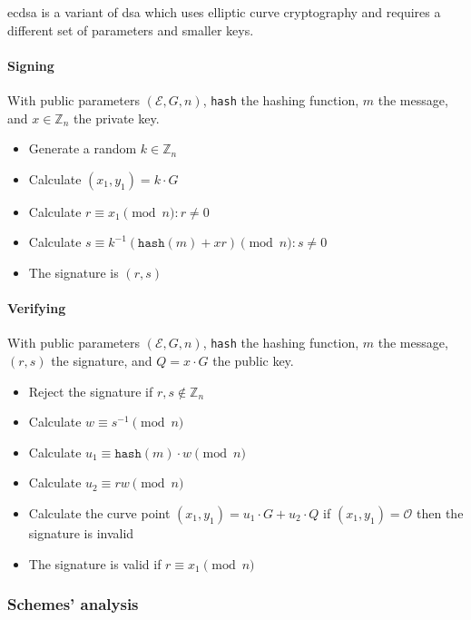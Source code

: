 \gls{ecdsa} is a variant of \gls{dsa} which uses elliptic curve cryptography and
requires a different set of parameters and smaller keys.

\paragraph{Signing}

With public parameters $(\mathcal{E}, G, n)$, \texttt{hash} the hashing function,
$m$ the message, and $x \in \mathbb{Z}_n$ the private key.

\begin{itemize}
  \item Generate a random $k \in \mathbb{Z}_n$
  \item Calculate $(x_1, y_1) = k \cdot G$
  \item Calculate $r \equiv x_1 \pmod n : r \neq 0$
  \item Calculate $s \equiv k^{-1}(\texttt{hash}(m) + xr) \pmod n : s \neq 0$
  \item The signature is $(r, s)$
\end{itemize}

\paragraph{Verifying}

With public parameters $(\mathcal{E}, G, n)$, \texttt{hash} the hashing function,
$m$ the message, $(r, s)$ the signature, and $Q = x \cdot G$ the public key.

\begin{itemize}
  \item Reject the signature if $r, s \notin \mathbb{Z}_n$
  \item Calculate $w \equiv s^{-1} \pmod n$
  \item Calculate $u_1 \equiv \texttt{hash}(m) \cdot w \pmod n$
  \item Calculate $u_2 \equiv rw \pmod n$
  \item Calculate the curve point $(x_1, y_1) = u_1 \cdot G + u_2 \cdot Q$ if
  $(x_1, y_1) = \mathcal{O}$ then the signature is invalid
  \item The signature is valid if $r \equiv x_1 \pmod n$
\end{itemize}

\subsubsection{Schemes' analysis}


